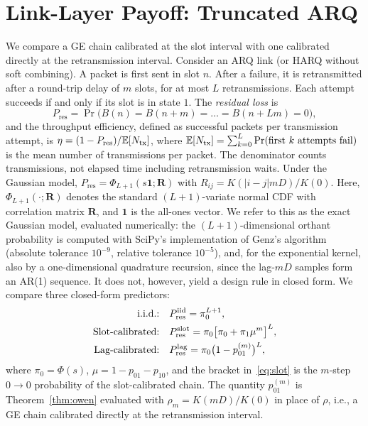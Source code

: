 \documentclass[conference]{IEEEtran}
\newcommand{\pres}{P_{\mathrm{res}}}
\DeclareMathOperator{\Prob}{Pr}
\begin{document}
\section{Link-Layer Payoff: Truncated ARQ}\label{sec:arq}
We compare a GE chain calibrated at the slot interval with one calibrated directly at the retransmission interval. Consider an ARQ link (or HARQ without soft combining). A packet is first sent in slot $n$. After a failure, it is retransmitted after a round-trip delay of $m$ slots, for at most $L$ retransmissions. Each attempt succeeds if and only if its slot is in state $1$. The \emph{residual loss} is
\begin{equation}
\pres=\Prob\big(B(n)=B(n{+}m)=\dots=B(n{+}Lm)=0\big),
\end{equation}
and the throughput efficiency, defined as successful packets per transmission attempt, is $\eta=(1-\pres)/\mathbb{E}[N_{\rm tx}]$, where $\mathbb{E}[N_{\rm tx}]=\sum_{k=0}^{L}\Prob(\text{first }k\text{ attempts fail})$ is the mean number of transmissions per packet. The denominator counts transmissions, not elapsed time including retransmission waits. Under the Gaussian model, $\pres=\Phi_{L+1}(s\mathbf{1};\mathbf{R})$ with $R_{ij}=K(|i-j|mD)/K(0)$. Here, $\Phi_{L+1}(\cdot;\mathbf{R})$ denotes the standard $(L{+}1)$-variate normal CDF with correlation matrix $\mathbf{R}$, and $\mathbf{1}$ is the all-ones vector. We refer to this as the exact Gaussian model, evaluated numerically: the $(L{+}1)$-dimensional orthant probability is computed with SciPy's implementation of Genz's algorithm~\cite{genz1992} (absolute tolerance $10^{-9}$, relative tolerance $10^{-5}$), and, for the exponential kernel, also by a one-dimensional quadrature recursion, since the lag-$mD$ samples form an AR(1) sequence. It does not, however, yield a design rule in closed form. We compare three closed-form predictors:
\begin{align}
\text{i.i.d.:}\quad &\pres^{\rm iid}=\pi_0^{L+1},\label{eq:iid}\\
\text{Slot-calibrated:}\quad &\pres^{\rm slot}=\pi_0\big[\pi_0+\pi_1\mu^{m}\big]^{L},\label{eq:slot}\\
\text{Lag-calibrated:}\quad &\pres^{\rm lag}=\pi_0\big(1-p^{(m)}_{01}\big)^{L},\label{eq:lag}
\end{align}
where $\pi_0=\Phi(s)$, $\mu=1-p_{01}-p_{10}$, and the bracket in~\eqref{eq:slot} is the $m$-step $0\to0$ probability of the slot-calibrated chain. The quantity $p^{(m)}_{01}$ is Theorem~\ref{thm:owen} evaluated with $\rho_m=K(mD)/K(0)$ in place of $\rho$, i.e., a GE chain calibrated directly at the retransmission interval.
\end{document}
